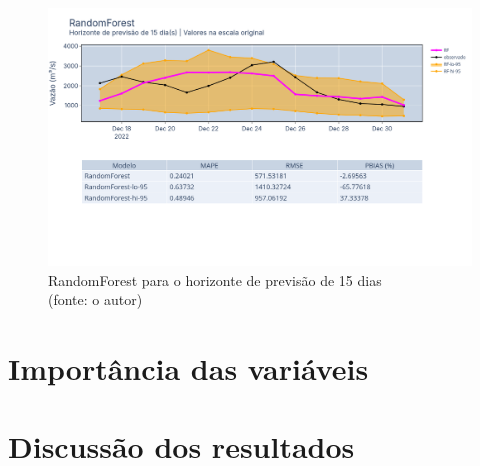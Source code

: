 \begin{figure}[!h]
	\centering
	\includegraphics[scale=0.33]{Figuras/jequiti/resultados/RandomForest_fh15.png}
	\caption{RandomForest para o horizonte de previsão de 15 dias\\(fonte: o autor)}
	\label{fig:jequiti_RandomForest_fh15}
\end{figure}
\clearpage

\section{Importância das variáveis}

\section{Discuss\~ao dos resultados}
